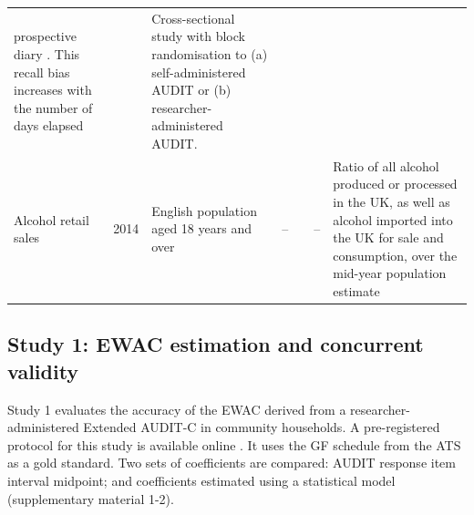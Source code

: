 \documentclass[]{article}
\begin{document}
\begin{longtable}[]{@{}lllllrl@{}}
\begin{minipage}[t]{0.12\columnwidth}
prospective diary \citep{Grant1995}. This recall bias increases with the
number of days elapsed \citep{Hoeppner2010, Vinson2003}\strut
\end{minipage} & \begin{minipage}[t]{0.07\columnwidth}\raggedleft
130\strut
\end{minipage} & \begin{minipage}[t]{0.12\columnwidth}\raggedright
Cross-sectional study with block randomisation to (a) self-administered
AUDIT or (b) researcher-administered AUDIT.\strut
\end{minipage}\tabularnewline
\begin{minipage}[t]{0.12\columnwidth}\raggedright
Alcohol retail sales \citep{PHE2017}\strut
\end{minipage} & \begin{minipage}[t]{0.12\columnwidth}\raggedright
2014\strut
\end{minipage} & \begin{minipage}[t]{0.12\columnwidth}\raggedright
English population aged 18 years and over\strut
\end{minipage} & \begin{minipage}[t]{0.12\columnwidth}\raggedright
--\strut
\end{minipage} & \begin{minipage}[t]{0.12\columnwidth}\raggedright
\citep{PHE2017}\strut
\end{minipage} & \begin{minipage}[t]{0.07\columnwidth}\raggedleft
--\strut
\end{minipage} & \begin{minipage}[t]{0.12\columnwidth}\raggedright
Ratio of all alcohol produced or processed in the UK, as well as alcohol
imported into the UK for sale and consumption, over the mid-year
population estimate\strut
\end{minipage}\tabularnewline
\bottomrule
\end{longtable}

\hypertarget{study-1-ewac-estimation-and-concurrent-validity}{%
\subsection{Study 1: EWAC estimation and concurrent
validity}\label{study-1-ewac-estimation-and-concurrent-validity}}

Study 1 evaluates the accuracy of the EWAC derived from a
researcher-administered Extended AUDIT-C in community households. A
pre-registered protocol for this study is available online
\citep{Dutey2018}. It uses the GF schedule from the ATS as a gold
standard. Two sets of coefficients are compared: AUDIT response item
interval midpoint; and coefficients estimated using a statistical model
(supplementary material 1-2).
\end{document}
